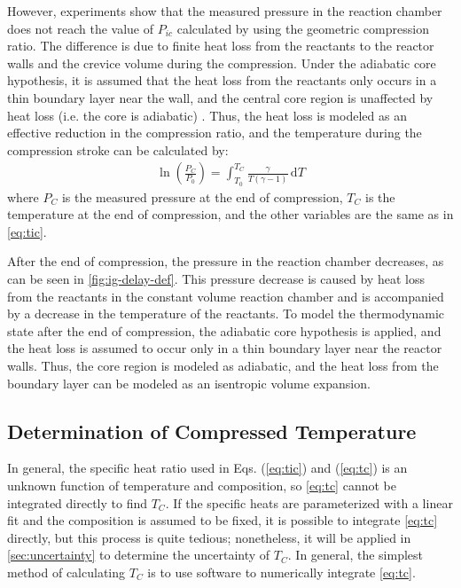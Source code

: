\documentclass[../main.tex]{subfiles}
\begin{document}
However, experiments show that the measured pressure in the reaction chamber
does not reach the value of $P_{ic}$ calculated by using the geometric
compression ratio. The difference is due to finite heat loss from the
reactants to the reactor walls and the crevice volume during the
compression. Under the adiabatic core hypothesis, it is assumed that
the heat loss from the reactants only occurs in a thin boundary layer
near the wall, and the central core region is unaffected by heat loss
(i.e. the core is adiabatic) \cite{Desgroux1995}. Thus, the heat
loss is modeled as an effective reduction in the compression ratio, and
the temperature during the compression stroke can be calculated by:
%
\begin{align}
\ln\left(\frac{P_{C}}{P_0}\right) = \int_{T_0}^{T_{C}} \! \frac{\gamma}{T\left(\gamma-1\right)} \, \mathrm{d} T
\label{eq:tc}
\end{align}
%
where $P_C$ is the measured pressure at the end of compression, $T_C$
is the temperature at the end of compression, and the other variables
are the same as in \autoref{eq:tic}.

After the end of compression, the pressure in the reaction chamber
decreases, as can be seen in \autoref{fig:ig-delay-def}. This pressure
decrease is caused by heat loss from the reactants in the constant volume reaction
chamber and is accompanied by a decrease in the temperature of the
reactants. To model the thermodynamic state after the end of compression,
the adiabatic core hypothesis is applied, and the heat loss is
assumed to occur only in a thin boundary layer near the reactor walls.
Thus, the core region is modeled as adiabatic, and the heat loss
from the boundary layer can be modeled as an isentropic volume
expansion.

\subsection{Determination of Compressed Temperature}

In general, the specific heat ratio used in Eqs. (\ref{eq:tic}) and
(\ref{eq:tc}) is an unknown function of temperature and composition,
so \autoref{eq:tc} cannot be integrated directly to find $T_C$. If
the specific heats are parameterized with a linear fit and the
composition is assumed to be fixed, it is possible to integrate \autoref{eq:tc} directly,
but this process is quite tedious; nonetheless, it will be applied in
\autoref{sec:uncertainty} to determine the uncertainty of $T_C$. In
general, the simplest method of calculating $T_C$ is to use software
to numerically integrate \autoref{eq:tc}.
\end{document}
